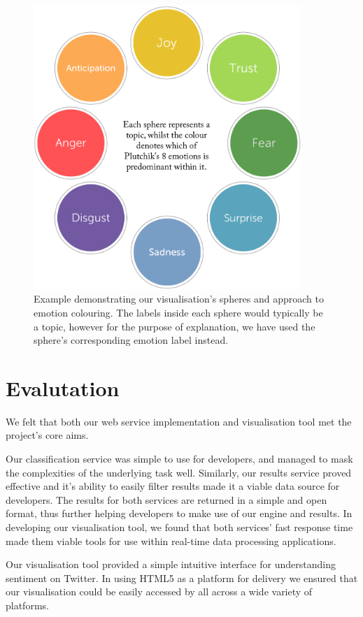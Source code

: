\begin{figure}
	\caption{Example demonstrating our visualisation's spheres and approach to emotion colouring. The labels inside each sphere would typically be a topic, however for the purpose of explanation, we have used the sphere's corresponding emotion label instead.}
	\label{fig:visualisation}
	\centering
		\includegraphics[width=0.9\textwidth]{figures/vis.pdf}
\end{figure}


\section{Evalutation}

We felt that both our web service implementation and visualisation tool met the project's core aims. 

Our classification service was simple to use for developers, and managed to mask the complexities of the underlying task well. Similarly, our results service proved effective and it's ability to easily filter results made it a viable data source for developers. The results for both services are returned in a simple and open format, thus further helping developers to make use of our engine and results. In developing our visualisation tool, we found that both services' fast response time made them viable tools for use within real-time data processing applications.

Our visualisation tool provided a simple intuitive interface for understanding sentiment on Twitter. In using HTML5 as a platform for delivery we ensured that our visualisation could be easily accessed by all across a wide variety of platforms.